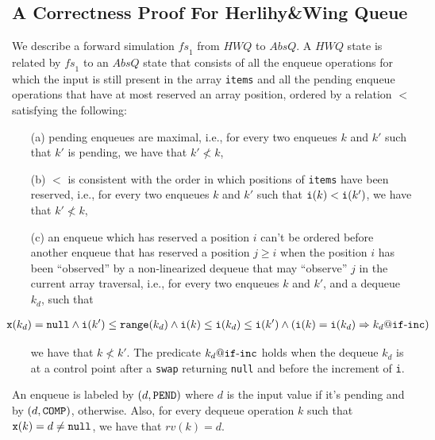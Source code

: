 \subsection{A Correctness Proof For Herlihy\&Wing Queue}\label{ssec:HerlihyWing}
\vspace{-1mm}
We describe a forward simulation $\mathit{fs}_1$ from $\mathit{HWQ}$ to $AbsQ$. A $\mathit{HWQ}$ state is related by $\mathit{fs}_1$ to an $AbsQ$ state that consists of all the  enqueue operations for which the input is still present in the array {\tt items} and all the pending enqueue operations that have at most reserved an array position, ordered by a relation $<$ satisfying the following: 
\vspace{-2mm}
\begin{itemize}
	\item[(a)] pending enqueues are maximal, i.e., for every two enqueues $k$ and $k'$ such that $k'$ is pending, we have that $k'\not< k$,
	\item[(b)] $<$ is consistent with the order in which positions of {\tt items} have been reserved, i.e., for every two enqueues $k$ and $k'$ such that ${\tt i}(k) < {\tt i}(k')$, we have that $k' \not< k$,
	\item[(c)] an enqueue which has reserved a position $i$ %
	can't be ordered before another enqueue that has reserved a position $j \geq i$ when the position $i$ has been ``observed'' by a non-linearized dequeue that may ``observe'' $j$ in the current array traversal, i.e., for every two enqueues $k$ and $k'$, and a dequeue $k_d$, such that 
	
	\vspace{-2mm}
	\noindent
	{\small
	\begin{align}
	\hspace{-8mm}
	{\tt x}(k_d)={\tt null} \land {\tt i}(k') \leq {\tt range}(k_d) \land {\tt i}(k) \leq {\tt i}(k_d) \leq {\tt i}(k')
	 \land ({\tt i}(k) = {\tt i}(k_d) => k_d\atCP {\tt if}\text{-}{\tt inc}) \label{eq:inst}
	\end{align}}
	
	\vspace{-6mm}
	\noindent
	we have that $k \not< k'$. The predicate $k_d\atCP {\tt if}\text{-}{\tt inc}$ holds when the dequeue $k_d$ is at a control point after a {\tt swap} returning {\tt null} and before the increment of {\tt i}.
\vspace{-2mm}
\end{itemize}

\noindent
An enqueue is labeled by $(d,{\tt PEND})$ where $d$ is the input value if it's pending and by  $(d,{\tt COMP})$, otherwise. Also, for every dequeue operation $k$ such that ${\tt x}(k)=d\neq {\tt null}$, we have that $rv(k)=d$.

